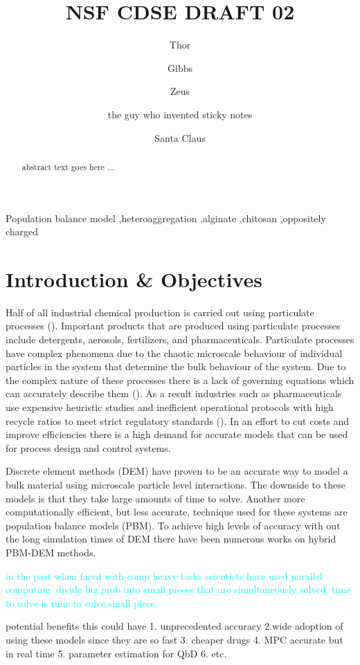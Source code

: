 \documentclass[preprint,11pt,authoryear]{elsarticle}
\begin{document}
	\begin{frontmatter}
	\title{ NSF CDSE DRAFT 02}
	\author{Thor }
	\author{Gibbs }
	\author{Zeus }
	\author{the guy who invented sticky notes }
	\author{Santa Claus} 
	\address{North Pole department of ice and snow Fwding address - Department of Chemical and Biochemical Engineering, Rutgers, The State University of New Jersey, Piscataway, NJ, USA 08854}
	\begin{abstract}
	 abstract text goes here ...
	\end{abstract}
	\begin{keyword}
	Population balance model \sep heteroaggregation \sep alginate  \sep chitosan \sep oppositely charged
	\end{keyword}
	\end{frontmatter}
	\linenumbers
	
	\section{Introduction \& Objectives} 

	\par Half of all industrial chemical production is carried out using particulate processes (\cite{seville1997}). Important products that are produced using particulate processes include detergents, aerosols, fertilizers, and pharmaceuticals. Particulate processes have complex phenomena due to the chaotic microscale behaviour of individual particles in the system that determine the bulk behaviour of the system. Due to the complex nature of these processes there is a lack of governing equations which can accurately describe them (\cite{sen2013}). As a result industries such as pharmaceuticals use expensive heuristic studies and inefficient operational protocols with high recycle ratios to meet strict regulatory standards (\cite{Ramachandran2009}). In an effort to cut costs and improve efficiencies there is a high demand for accurate models that can be used for process design and control systems.   
	\par Discrete element methods (DEM) have proven to be an accurate way to model a bulk material using microscale particle level interactions. The downside to these models is that they take large amounts of time to solve. Another more computationally efficient, but less accurate, technique used for these systems are population balance models (PBM). To achieve high levels of accuracy with out the long simulation times of DEM there have been numerous works on hybrid PBM-DEM methods.
	\par \textcolor{cyan}{in the past when faced with comp heavy tasks scientists have used parallel computing. divide big prob into small pieces that are simultaneously solved. time to solve is time to solve small piece.} 
	\par potential benefits this could have 1. unprecedented accuracy 2.wide adoption of using these models since they are so fast 3. cheaper drugs 4. MPC accurate but in real time 5. parameter estimation for QbD 6. etc. 
	
\end{document}
